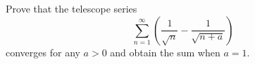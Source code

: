 \begin{exercise}
  \label{ex:hw04:shifted-root-series}
  Prove that the telescope series
  \[
    \sum_{n=1}^{\infty}\left(\frac{1}{\sqrt n}-\frac{1}{\sqrt{n+a}}\right)
  \]
  converges for any $a>0$ and obtain the sum when $a=1$.
\end{exercise}
